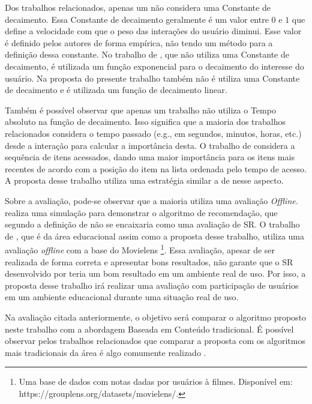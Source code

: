 Dos trabalhos relacionados, apenas um não considera uma Constante de decaimento. Essa Constante de decaimento geralmente
é um valor entre $0$ e $1$ que define a velocidade com que o peso das interações do usuário diminui. Esse valor é definido
pelos autores de forma empírica, não tendo um método para a definição dessa constante. No trabalho de ,
que não utiliza uma Constante de decaimento, é utilizada um função exponencial para o decaimento do interesse do usuário. Na
proposta do presente trabalho também não é utiliza uma Constante de decaimento e é utilizada um função de decaimento linear.

Também é possível observar que apenas um trabalho não utiliza o Tempo absoluto na função de decaimento. Isso significa que
a maioria dos trabalhos relacionados considera o tempo passado (e.g., em segundos, minutos, horas, etc.) desde a interação
para calcular a importância desta. O trabalho de  considera a sequência de itens acessados, dando
uma maior importância para os itens mais recentes de acordo com a posição do item na lista ordenada pelo tempo de acesso.
A proposta desse trabalho utiliza uma estratégia similar a de  nesse aspecto.

Sobre a avaliação, pode-se observar que a maioria utiliza uma avaliação \textit{Offline}.  realiza
uma simulação para demonstrar o algoritmo de recomendação, que segundo a definição de  não
se encaixaria como uma avaliação de SR. O trabalho de , que é da área educacional assim como a
proposta desse trabalho, utiliza uma avaliação \textit{offline} com a base do Movielens \footnote{Uma base de dados com
notas dadas por usuários à filmes. Disponível em: https://grouplens.org/datasets/movielens/.}.
Essa avaliação, apesar de ser realizada de forma correta e apresentar bons resultados, não garante que o SR desenvolvido por 
teria um bom resultado em um ambiente real de uso. Por isso, a proposta desse trabalho irá realizar uma avaliação com
participação de usuários em um ambiente educacional durante uma situação real de uso.

Na avaliação citada anteriormente, o objetivo será comparar o algoritmo proposto neste trabalho com a abordagem Baseada
em Conteúdo tradicional. É possível observar pelos trabalhos relacionados que comparar a proposta com os algoritmos mais
tradicionais da área é algo comumente realizado \cite{fan2015modeling, luo2010context, hawalah2014utilizing, qiao2015personalized, wei2013web}.

